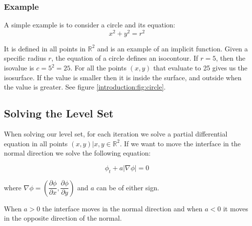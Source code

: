

\subsubsection{Example}

A simple example is to consider a circle and its equation:
\begin{equation*}
  x^{2} + y^{2} = r^{2}
\end{equation*}

It is defined in all points in $\mathbb{R}^{2}$ and is an example of an implicit function. Given a specific radius $r$, the equation of a circle defines an isocontour. If $r = 5$, then the isovalue is $c = 5^{2} = 25$. For all the points $(x,y)$ that evaluate to 25 gives us the isosurface. If the value is smaller then it is inside the surface, and outside when the value is greater. See figure \vref{introduction:fig:circle}.



\subsection{Solving the Level Set}

When solving our level set, for each iteration we solve a partial differential equation in all points $(x,y) | x,y \in \mathbb{R}^{2}$. If we want to move the interface in the normal direction we solve the following equation:

\begin{equation}
\label{introduction:eq:levelsetndirection}
  \phi_{t} + a|\nabla \phi| = 0
\end{equation}

where $\nabla \phi = (\dfrac{\partial \phi}{\partial x}, \dfrac{\partial \phi}{\partial y})$  and $a$ can be of either sign. 

When $a > 0$ the interface moves in the normal direction and when $a < 0$ it moves in the opposite direction of the normal.

